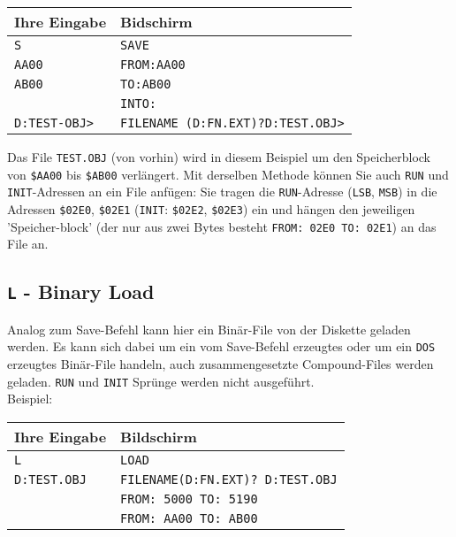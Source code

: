 \documentclass[10pt,a4paper,twoside,final,openright,titlepage]{memoir}
\newcommand{\key}[1]{\keystroke{\tiny #1}}
\begin{document}
\begin{enumerate}[a)]
\renewcommand{\arraystretch}{1.2}
\begin{tabular}{p{10em}p{18em}}
Ihre Eingabe	& Bidschirm \\ \hline
\texttt{S}				& \texttt{SAVE} \\
\texttt{AA00}			& \texttt{FROM:AA00} \\
\texttt{AB00}			& \texttt{TO:AB00} \\
\key{RETURN} 			& \texttt{INTO:} \\
\texttt{D:TEST-OBJ>}	& \texttt{FILENAME (D:FN.EXT)?D:TEST.OBJ>} \\
\end{tabular}
\renewcommand{\arraystretch}{1.8}
\bigskip

Das File \texttt{TEST.OBJ} (von vorhin) wird in diesem Beispiel
um den Speicherblock von \texttt{\$AA00} bis \texttt{\$AB00} verlängert.
Mit derselben Methode können Sie auch \texttt{RUN} und \texttt{INIT}-Adressen
an ein File anfügen: Sie tragen die \texttt{RUN}-Adresse
(\texttt{LSB}, \texttt{MSB}) in die Adressen \texttt{\$02E0}, \texttt{\$02E1} (\texttt{INIT}:
\texttt{\$02E2}, \texttt{\$02E3}) ein und hängen den jeweiligen 'Speicher-block'
(der nur aus zwei Bytes besteht \texttt{FROM: 02E0 TO: 02E1}) an das File an.
\end{enumerate}

\subsection{\texttt{L} - Binary Load}

Analog zum Save-Befehl kann hier ein Binär-File von
der Diskette geladen werden. Es kann sich dabei um ein
vom Save-Befehl erzeugtes oder um ein \texttt{DOS} erzeugtes
Binär-File handeln, auch zusammengesetzte Compound-Files
werden geladen. \texttt{RUN} und \texttt{INIT} Sprünge werden
nicht ausgeführt.\\

Beispiel: \\

\renewcommand{\arraystretch}{1.2}
\begin{tabular}{p{10em}p{10em}}
Ihre Eingabe	& Bildschirm \\ \hline
\texttt{L}				& \texttt{LOAD} \\
\texttt{D:TEST.OBJ}		& \texttt{FILENAME(D:FN.EXT)? D:TEST.OBJ} \\
						& \texttt{FROM: 5000 TO: 5190} \\
						& \texttt{FROM: AA00 TO: AB00} \\
\end{tabular}
\renewcommand{\arraystretch}{1.8}
\bigskip
\end{document}

